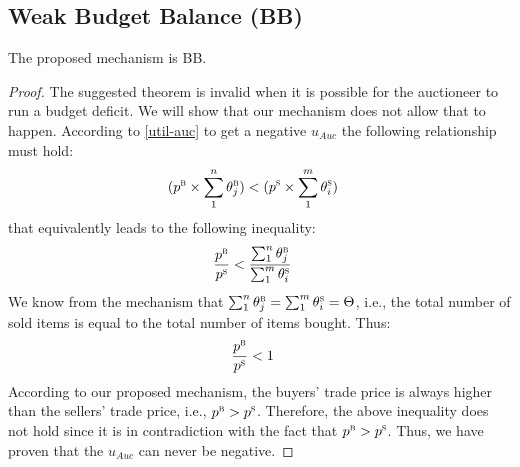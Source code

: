 \subsection{Weak Budget Balance (BB)}
\begin{Theorem}
The proposed mechanism is BB.
\end{Theorem}
\begin{proof}
The suggested theorem is invalid when it is possible for the auctioneer to run a budget deficit. We will show that our mechanism does not allow that to happen.
According to \autoref{util-auc} to get a negative $u_{Auc}$ the following relationship must hold:
\begin{align*}
(p^\textsc{b} \times \sum_{1}^n {\theta_{j}^\textsc{b}}) &< (p^\textsc{s} \times \sum_{1}^m {\theta_{i}^\textsc{s}})
\end{align*}
that equivalently leads to the following inequality:
\begin{align*}
\frac{p^\textsc{b}}{p^\textsc{s}} &< \frac{\sum_{1}^n {\theta_{j}^\textsc{b}}}{\sum_{1}^m {\theta_{i}^\textsc{s}}}
\end{align*}
We know from the mechanism that $\sum_{1}^n {\theta_{j}^\textsc{b}}=\sum_{1}^m {\theta_{i}^\textsc{s}}=\Theta$, i.e., the total number of sold items is equal to the total number of items bought. Thus:
\begin{align*}
\frac{p^\textsc{b}}{p^\textsc{s}} &< 1 \qedhere
\end{align*}
According to our proposed mechanism, the buyers' trade price is always higher than the sellers' trade price, i.e., ${p^\textsc{b}}>{p^\textsc{s}}$. Therefore, the above inequality does not hold since it is in contradiction with the fact that ${p^\textsc{b}}>{p^\textsc{s}}$. Thus, we have proven that the $u_{Auc}$ can never be negative.
\end{proof}


